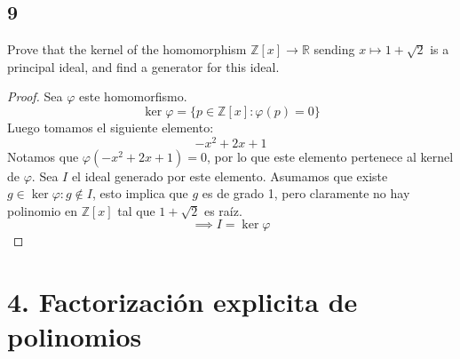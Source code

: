 \documentclass[11pt]{article}
\newcommand{\set}[1]{\mathbb{#1}}
\theoremstyle{definition}
\begin{document}
    \subsection{9}
    Prove that the kernel of the homomorphism $\set{Z}[x]\rightarrow \set{R}$ sending $x\mapsto 1+\sqrt{2}$ is a principal ideal, and find a generator for this ideal.
    \begin{proof}
        Sea $\varphi$ este homomorfismo.
        \[\ker\varphi=\{p\in\set{Z}[x]:\varphi(p)=0\}\]
        Luego tomamos el siguiente elemento:
        \[-x^2+2x+1\]
        Notamos que $\varphi(-x^2+2x+1)=0$, por lo que este elemento pertenece al kernel de $\varphi$. Sea $I$ el ideal generado por este elemento. Asumamos que existe $g\in\ker\varphi:g\notin I$, esto implica que $g$ es de grado 1, pero claramente no hay polinomio en $\set{Z}[x]$ tal que $1+\sqrt{2}$ es raíz.
        \[\implies I=\ker\varphi\]
    \end{proof}

    \section{4. Factorización explicita de polinomios}
\end{document}
